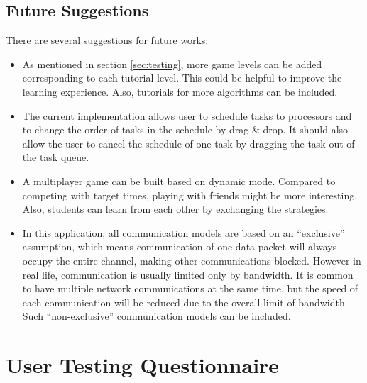 \documentclass[msc,deptreport, cs]{infthesis}
\begin{document}
\section{Future Suggestions} 

There are several suggestions for future works:

\begin{itemize}
  \item As mentioned in section \ref{sec:testing}, more game levels can be added corresponding to each tutorial level. This could be helpful to improve the learning experience. Also, tutorials for more algorithms can be included.
  \item The current implementation allows user to schedule tasks to processors and to change the order of tasks in the schedule by drag \& drop. It should also allow the user to cancel the schedule of one task by dragging the task out of the task queue.
  \item A multiplayer game can be built based on dynamic mode. Compared to competing with target times, playing with friends might be more interesting. Also, students can learn from each other by exchanging the strategies.
  \item In this application, all communication models are based on an ``exclusive'' assumption, which means communication of one data packet will always occupy the entire channel, making other communications blocked. However in real life, communication is usually limited only by bandwidth. It is common to have multiple network communications at the same time, but the speed of each communication will be reduced due to the overall limit of bandwidth. Such ``non-exclusive'' communication models can be included.
\end{itemize}





\appendix

\chapter{User Testing Questionnaire}


\end{document}
